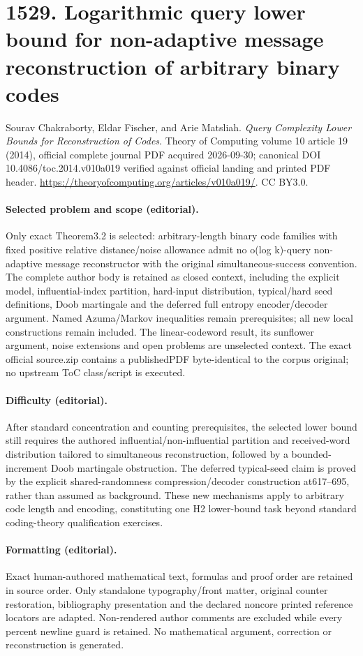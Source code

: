 \documentclass[10pt]{article}
\theoremstyle{definition}
\numberwithin{equation}{section}
\begin{document}
\section*{1529. Logarithmic query lower bound for non-adaptive message reconstruction of arbitrary binary codes}
Sourav Chakraborty, Eldar Fischer, and Arie Matsliah. \emph{Query Complexity Lower Bounds for Reconstruction of Codes}. Theory of Computing volume 10 article 19 (2014), official complete journal PDF acquired 2026-09-30; canonical DOI 10.4086/toc.2014.v010a019 verified against official landing and printed PDF header. \url{https://theoryofcomputing.org/articles/v010a019/}. CC BY3.0.
\paragraph{Selected problem and scope (editorial).} Only exact Theorem3.2 is selected: arbitrary-length binary code families with fixed positive relative distance/noise allowance admit no o(log k)-query non-adaptive message reconstructor with the original simultaneous-success convention. The complete author body is retained as closed context, including the explicit model, influential-index partition, hard-input distribution, typical/hard seed definitions, Doob martingale and the deferred full entropy encoder/decoder argument. Named Azuma/Markov inequalities remain prerequisites; all new local constructions remain included. The linear-codeword result, its sunflower argument, noise extensions and open problems are unselected context. The exact official source.zip contains a publishedPDF byte-identical to the corpus original; no upstream ToC class/script is executed.
\paragraph{Difficulty (editorial).} After standard concentration and counting prerequisites, the selected lower bound still requires the authored influential/non-influential partition and received-word distribution tailored to simultaneous reconstruction, followed by a bounded-increment Doob martingale obstruction. The deferred typical-seed claim is proved by the explicit shared-randomness compression/decoder construction at617–695, rather than assumed as background. These new mechanisms apply to arbitrary code length and encoding, constituting one H2 lower-bound task beyond standard coding-theory qualification exercises.
\paragraph{Formatting (editorial).} Exact human-authored mathematical text, formulas and proof order are retained in source order. Only standalone typography/front matter, original counter restoration, bibliography presentation and the declared noncore printed reference locators are adapted. Non-rendered author comments are excluded while every percent newline guard is retained. No mathematical argument, correction or reconstruction is generated.
\end{document}
